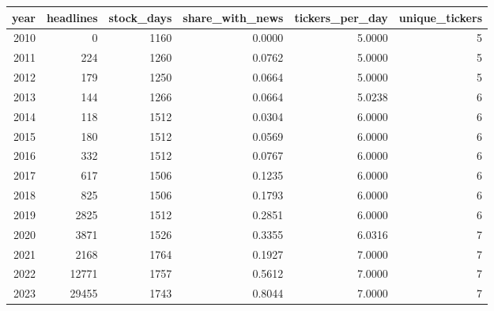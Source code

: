 \begin{tabular}{rrrrrr}
\toprule
year & headlines & stock\_days & share\_with\_news & tickers\_per\_day & unique\_tickers \\
\midrule
2010 & 0 & 1160 & 0.0000 & 5.0000 & 5 \\
2011 & 224 & 1260 & 0.0762 & 5.0000 & 5 \\
2012 & 179 & 1250 & 0.0664 & 5.0000 & 5 \\
2013 & 144 & 1266 & 0.0664 & 5.0238 & 6 \\
2014 & 118 & 1512 & 0.0304 & 6.0000 & 6 \\
2015 & 180 & 1512 & 0.0569 & 6.0000 & 6 \\
2016 & 332 & 1512 & 0.0767 & 6.0000 & 6 \\
2017 & 617 & 1506 & 0.1235 & 6.0000 & 6 \\
2018 & 825 & 1506 & 0.1793 & 6.0000 & 6 \\
2019 & 2825 & 1512 & 0.2851 & 6.0000 & 6 \\
2020 & 3871 & 1526 & 0.3355 & 6.0316 & 7 \\
2021 & 2168 & 1764 & 0.1927 & 7.0000 & 7 \\
2022 & 12771 & 1757 & 0.5612 & 7.0000 & 7 \\
2023 & 29455 & 1743 & 0.8044 & 7.0000 & 7 \\
\bottomrule
\end{tabular}
